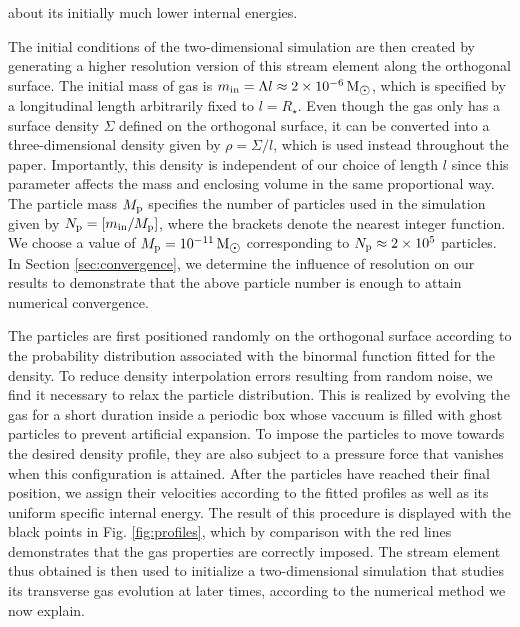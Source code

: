 \documentclass[a4paper,fleqn,usenatbib]{mnras}
\newcommand{\rstar}{R_{\star}}
\def\msun{\, \mathrm{M}_{\hbox{$\odot$}}}
\begin{document}
about its initially much lower internal energies.





The initial conditions of the two-dimensional simulation are then created by generating a higher resolution version of this stream element along the orthogonal surface. The initial mass of gas is $m_{\rm in} = \Lambda l \approx 2 \times 10^{-6} \msun$, which is specified by a longitudinal length  arbitrarily fixed to $l=\rstar$. Even though the gas only has a surface density $\Sigma$ defined on the orthogonal surface, it can be converted into a three-dimensional density given by $\rho = \Sigma / l$, which is used instead throughout the paper. Importantly, this density is independent of our choice of length $l$ since this parameter affects the mass and enclosing volume in the same proportional way. The particle mass $M_{\rm p}$ specifies the number of particles used in the simulation given by $N_{\rm p} = \left[m_{\rm in}/M_{\rm p}\right]$, where the brackets denote the nearest integer function. We choose a value of $M_{\rm p} = 10^{-11} \msun$ corresponding to $N_{\rm p} \approx 2 \times 10^5$ particles. In Section \ref{sec:convergence}, we determine the influence of resolution on our results to demonstrate that the above particle number is enough to attain numerical convergence.



The particles are first positioned randomly on the orthogonal surface according to the probability distribution associated with the binormal function fitted for the density. To reduce density interpolation errors resulting from random noise, we find it necessary to relax the particle distribution. This is realized by evolving the gas for a short duration inside a periodic box whose vaccuum is filled with ghost particles to prevent artificial expansion. To impose the particles to move towards the desired density profile, they are also subject to a pressure force that vanishes when this configuration is attained. After the particles have reached their final position, we assign their velocities according to the fitted profiles as well as its uniform specific internal energy. The result of this procedure is displayed with the black points in Fig. \ref{fig:profiles}, which by comparison with the red lines demonstrates that the gas properties are correctly imposed. The stream element thus obtained is then used to initialize a two-dimensional simulation that studies its transverse gas evolution at later times, according to the numerical method we now explain.
\end{document}

